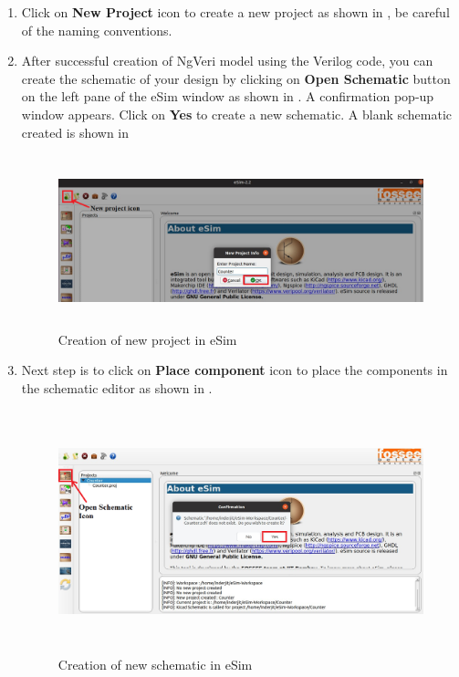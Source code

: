 \begin{enumerate}

\item Click on \textbf{New Project} icon to create a new project as shown in , be careful of the naming conventions.

\item After successful creation of NgVeri model using the Verilog code, you can create the schematic of your design by clicking on \textbf{Open Schematic} button on the left pane of the eSim window as shown in . A confirmation pop-up window appears. Click on \textbf{Yes} to create a new schematic. A blank schematic created is shown in 

\begin{figure}[H]
\centering
\includegraphics[width = 14cm, height =5cm]{./NgVeri/newproject.png}
\caption{Creation of new project in eSim}
\label{newproject}
\end{figure}

\item Next step is to click on \textbf{Place component} icon to place the components in the schematic editor as shown in .

\begin{figure}[H]
\centering
\includegraphics[width = 14cm, height =7cm]{./NgVeri/newschematic.png}
\caption{Creation of new schematic in eSim}
\label{newschematic}
\end{figure}


\end{enumerate}
